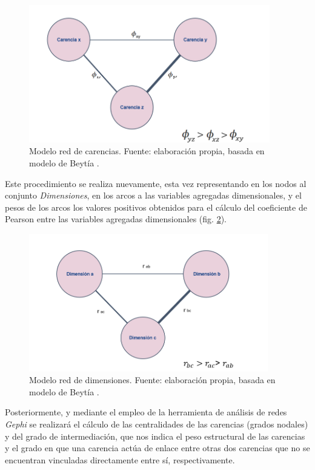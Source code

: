 \documentclass[12pt,letterpaper,spanish]{article}
\begin{document}
\begin{enumerate}
\begin{figure}[H]
    \centering
    \includegraphics[height=6cm]{Max/redes_phi.png}
    \caption{Modelo red de carencias. Fuente: elaboración propia, basada en modelo de Beytía \cite{Beytia2016PobrezaChile}.}
    \label{modelo_red_carencias}
\end{figure}

Este procedimiento se realiza nuevamente, esta vez representando en los nodos al conjunto \textit{Dimensiones}, en los arcos a las variables agregadas dimensionales, y el pesos de los arcos los valores positivos obtenidos para el cálculo del coeficiente de Pearson entre las variables agregadas dimensionales (fig. \ref{modelo_red_dimensiones}).


\begin{figure}[H]
    \centering
    \includegraphics[height=6cm]{Max/redes_pearson.png}
    \caption{Modelo red de dimensiones. Fuente: elaboración propia, basada en modelo de Beytía \cite{Beytia2016PobrezaChile}.}
    \label{modelo_red_dimensiones}
\end{figure}

Posteriormente, y mediante el empleo de la herramienta de análisis de redes \textit{Gephi} se realizará el cálculo de las centralidades de las carencias (grados nodales) y del grado de intermediación, que nos indica el peso estructural de las carencias y el grado en que una carencia actúa de enlace entre otras dos carencias que no se encuentran vinculadas directamente entre sí, respectivamente. 

\end{enumerate}
\end{document}
